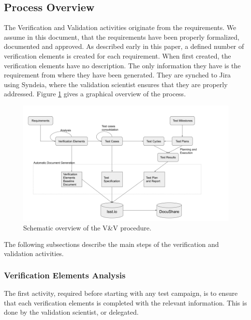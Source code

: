 \subsection{Process Overview}\label{sec:proc}

The Verification and Validation activities originate from the requirements.
We assume in this document, that the requirements have been properly formalized, documented and approved.
As described early in this paper, a defined number of verification elements is created for each requirement.
When first created, the verification elements have no description. The only information they have is the requirement from where they have been generated.
They are synched to Jira using Syndeia, where the validation scientist ensures that they are properly addressed.
Figure  \ref{fig:vandvtools} gives a graphical overview of the process.

\begin{figure}
\begin{center}
\includegraphics[width=\textwidth]{imgs/VandVprocedure.png}
 \caption{Schematic overview of the V\&V procedure.}
 \label{fig:vandvtools}
\end{center}
\end{figure}

The following subsections describe the main steps of the verification and validation activities.


\subsubsection{Verification Elements Analysis}

The first activity, required before starting with any test campaign, is to ensure that each verification elements is completed with the relevant information.
This is done by the validation scientist, or delegated.

